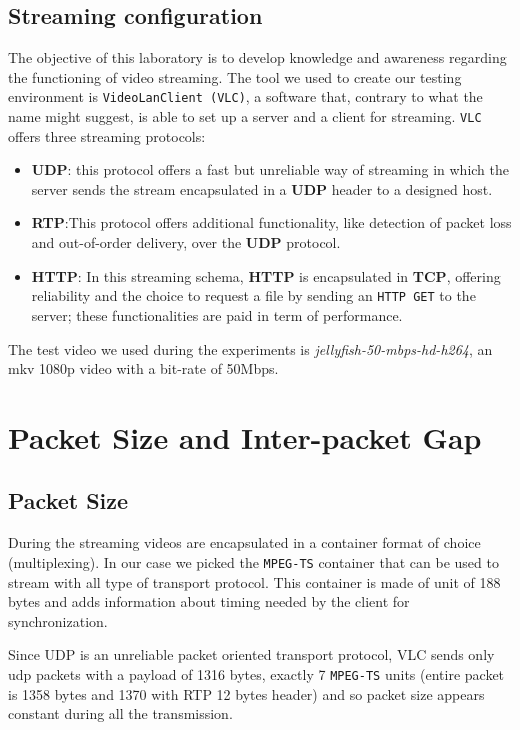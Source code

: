 \documentclass{exam}
\begin{document}
\subsection{Streaming configuration}
The objective of this laboratory is to develop knowledge and awareness regarding the functioning of video streaming. The tool we used to create our testing environment is \verb|VideoLanClient (VLC)|, a software that, contrary to what the name might suggest, is able to set up a server and a client for streaming. \verb|VLC| offers three streaming protocols: 
\begin{itemize}
    \item \textbf{UDP}: this protocol offers a fast but unreliable way of streaming in which the server sends the stream encapsulated in a \textbf{UDP} header to a designed host.
    \item \textbf{RTP}:This protocol offers additional functionality, like detection of packet loss and out-of-order delivery, over the \textbf{UDP} protocol.
    \item \textbf{HTTP}: In this streaming schema, \textbf{HTTP} is encapsulated in \textbf{TCP}, offering reliability and the choice to request a file by sending an \verb|HTTP GET| to the server; these functionalities are paid in term of performance. 
\end{itemize}

The test video we used during the experiments is \textit{jellyfish-50-mbps-hd-h264}, an mkv 1080p video with a bit-rate of 50Mbps. 

\section{Packet Size and Inter-packet Gap}
\subsection{Packet Size}
During the streaming videos are encapsulated in a container format of choice (multiplexing). In our case we picked the \verb|MPEG-TS| container that can be used to stream with all type of transport protocol. This container is made of unit of 188 bytes and adds information about timing needed by the client for synchronization. 

Since UDP is an unreliable packet oriented transport protocol, VLC sends only udp packets with a payload of 1316 bytes, exactly 7 \verb|MPEG-TS| units (entire packet is 1358 bytes and 1370 with RTP 12 bytes header) and so packet size appears constant during all the transmission. 
\end{document}
